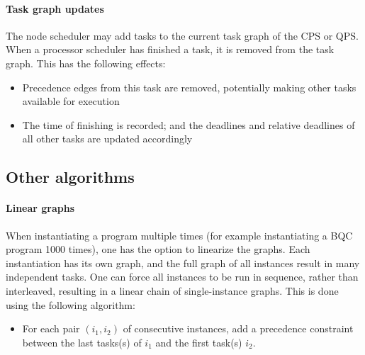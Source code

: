 \paragraph{Task graph updates}
The node scheduler may add tasks to the current task graph of the CPS or QPS.
When a processor scheduler has finished a task, it is removed from the task graph.
This has the following effects:
\begin{itemize}
    \item Precedence edges from this task are removed, potentially making other tasks available for execution
    \item The time of finishing is recorded; and the deadlines and relative deadlines of all other tasks are updated accordingly
\end{itemize}



\subsection{Other algorithms}
\paragraph{Linear graphs}

When instantiating a program multiple times (for example instantiating a BQC program 1000 times), one has the option to linearize the graphs. Each instantiation has its own graph,
and the full graph of all instances result in many independent tasks.
One can force all instances to be run in sequence, rather than interleaved, resulting in a linear chain of single-instance graphs. This is done using the following algorithm:

\begin{itemize}
    \item For each pair $(i_1, i_2)$ of consecutive instances, add a precedence constraint between the last tasks(s) of $i_1$ and the first task(s) $i_2$.
\end{itemize}

